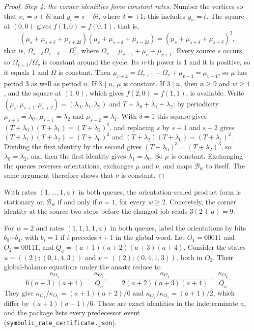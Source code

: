 \documentclass[11pt,a4paper]{article}
\theoremstyle{plain}
\theoremstyle{plain}
\newcommand{\Bal}{\mathcal{B}}
\begin{document}
\begin{proof}
\emph{Step 4: the corner identities force constant rates.} Number the vertices so that $x_i=s+\delta i$ and $y_i=s-\delta i$, where $\delta=\pm1$; this includes $y_w=t$. The square at $(0,0)$ gives $f(1,0)=f(0,1)$, that is,
\[
(\mu_s+\mu_{s+\delta}+\mu_{s+2\delta})(\mu_s+\mu_{s-\delta}+\mu_{s-2\delta})=(\mu_s+\mu_{s+\delta}+\mu_{s-\delta})^2,
\]
that is, $\Omega_{s+\delta}\Omega_{s-\delta}=\Omega_s^2$, where $\Omega_v=\mu_{v-1}+\mu_v+\mu_{v+1}$. Every source $s$ occurs, so $\Omega_{v+1}/\Omega_v$ is constant around the cycle. Its $n$-th power is $1$ and it is positive, so it equals $1$ and $\Omega$ is constant. Then $\mu_{v+2}=\Omega_{v+1}-\Omega_v+\mu_{v-1}=\mu_{v-1}$, so $\mu$ has period $3$ as well as period $n$. If $3\nmid n$, $\mu$ is constant. If $3\mid n$, then $n\ge9$ and $w\ge4$, and the square at $(1,0)$, which gives $f(2,0)=f(1,1)$, is available. Write $(\mu_s,\mu_{s+1},\mu_{s+2})=(\lambda_0,\lambda_1,\lambda_2)$ and $T=\lambda_0+\lambda_1+\lambda_2$; by periodicity $\mu_{s+3}=\lambda_0$, $\mu_{s-1}=\lambda_2$ and $\mu_{s-2}=\lambda_1$. With $\delta=1$ this square gives $(T+\lambda_0)(T+\lambda_1)=(T+\lambda_2)^2$, and replacing $s$ by $s+1$ and $s+2$ gives $(T+\lambda_1)(T+\lambda_2)=(T+\lambda_0)^2$ and $(T+\lambda_2)(T+\lambda_0)=(T+\lambda_1)^2$. Dividing the first identity by the second gives $(T+\lambda_0)^3=(T+\lambda_2)^3$, so $\lambda_0=\lambda_2$, and then the first identity gives $\lambda_1=\lambda_0$. So $\mu$ is constant. Exchanging the queues reverses orientations, exchanges $\mu$ and $\nu$, and maps $\Bal_w$ to itself. The same argument therefore shows that $\nu$ is constant.
\end{proof}

\begin{corollary}\label{cor:onerate}
With rates $(1,\dots,1,a)$ in both queues, the orientation-scaled product form is stationary on $\Bal_w$ if and only if $a=1$, for every $w\ge2$. Concretely, the corner identity at the source two steps before the changed job reads $3(2+a)=9$.
\end{corollary}

\begin{example}\label{ex:c5rows}
For $w=2$ and rates $(1,1,1,1,a)$ in both queues, label the orientations by bits $b_0\cdots b_4$, with $b_i=1$ if $i$ precedes $i+1$ in the global word. Let $O_1=00011$ and $O_2=00111$, and $Q_a=(a+1)(a+2)(a+3)(a+4)$. Consider the states $u=((2);(0,1,4,3))$ and $v=((2);(0,4,1,3))$, both in $O_2$. Their global-balance equations under the ansatz reduce to
\[
\frac{\kappa_{O_1}}{6(a+3)(a+4)}=\frac{\kappa_{O_2}}{Q_a},\qquad \frac{\kappa_{O_1}}{2(a+2)(a+3)(a+4)}=\frac{\kappa_{O_2}}{Q_a}.
\]
They give $\kappa_{O_2}/\kappa_{O_1}=(a+1)(a+2)/6$ and $\kappa_{O_2}/\kappa_{O_1}=(a+1)/2$, which differ by $(a+1)(a-1)/6$. These are exact identities in the indeterminate $a$, and the package lists every predecessor event (\texttt{symbolic\_rate\_certificate.json}).
\end{example}
\end{document}
